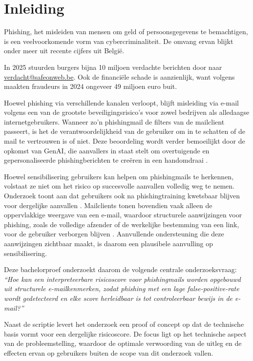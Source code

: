 \section{Inleiding}%
\label{sec:inleiding}
Phishing, het misleiden van mensen om geld of persoonsgegevens te bemachtigen, is een veelvoorkomende vorm van cybercriminaliteit. De omvang ervan blijkt onder meer uit recente cijfers uit België.

In 2025 stuurden burgers bijna 10 miljoen verdachte berichten door naar \url{verdacht@safeonweb.be}. Ook de financiële schade is aanzienlijk, want volgens \textcite{Febelfin2025} maakten fraudeurs in 2024 ongeveer 49 miljoen euro buit.

Hoewel phishing via verschillende kanalen verloopt, blijft misleiding via e-mail volgens \textcite{Veit2025} een van de grootste beveiligingsrisico's voor zowel bedrijven als alledaagse internetgebruikers. Wanneer zo'n phishingmail de filters van de mailclient passeert, is het de verantwoordelijkheid van de gebruiker om in te schatten of de mail te vertrouwen is of niet. Deze beoordeling wordt verder bemoeilijkt door de opkomst van GenAI, die aanvallers in staat stelt om overtuigende en gepersonaliseerde phishingberichten te creëren in een handomdraai \autocite{SchmittFlechais2024}.

Hoewel sensibilisering gebruikers kan helpen om phishingmails te herkennen, volstaat ze niet om het risico op succesvolle aanvallen volledig weg te nemen. Onderzoek toont aan dat gebruikers ook na phishing\-training kwetsbaar blijven voor dergelijke aanvallen \autocite{Marshall2024}. Mailclients tonen bovendien vaak alleen de oppervlakkige weergave van een e-mail, waardoor structurele aanwijzingen voor phishing, zoals de volledige afzender of de werkelijke bestemming van een link, voor de gebruiker verborgen blijven \autocite{Veit2025}. Aanvullende ondersteuning die deze aanwijzingen zichtbaar maakt, is daarom een plausibele aanvulling op sensibilisering.

Deze bachelorproef onderzoekt daarom de volgende centrale onderzoeksvraag: \emph{``Hoe kan een interpreteerbare risicoscore voor phishingmails worden opgebouwd uit structurele e-mail\-ken\-mer\-ken, zodat phishing met een lage false-positive-rate wordt gedetecteerd en elke score herleidbaar is tot controleerbaar bewijs in de e-mail?''}

Naast de scriptie levert het onderzoek een proof of concept op dat de technische basis vormt voor een dergelijke risicoscore. De focus ligt op het technische aspect van de probleemstelling, waardoor de optimale verwoording van de uitleg en de effecten ervan op gebruikers buiten de scope van dit onderzoek vallen.

